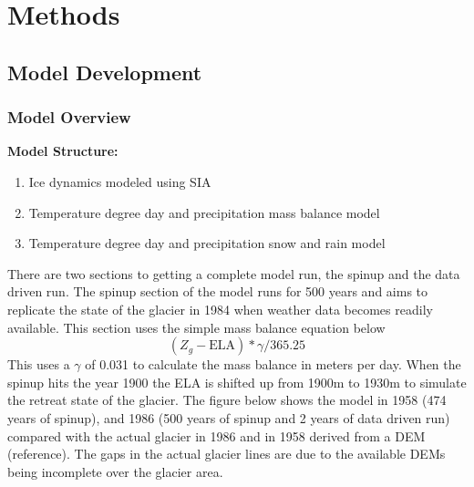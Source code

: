 \documentclass{article}
\begin{document}
\section{Methods}

\subsection{Model Development}
\subsubsection{Model Overview}

\textbf{Model Structure:}
\begin{enumerate}[leftmargin=2cm]
    \item Ice dynamics modeled using SIA
    \item Temperature degree day and precipitation mass balance model
    \item Temperature degree day and precipitation snow and rain model
\end{enumerate}

There are two sections to getting a complete model run, the spinup and the data driven run. The spinup section of the model runs for 500 years and aims to replicate the 
state of the glacier in 1984 when weather data becomes readily available. This section uses the simple mass balance equation below
\begin{equation}(Z_g-\text{ELA})*\gamma /365.25\end{equation}
This uses a $\gamma$ of 0.031 to calculate the mass balance in meters per day. When the spinup hits the year 1900 the ELA is shifted up from 1900m to 1930m to simulate the 
retreat state of the glacier. The figure below shows the model in 1958 (474 years of spinup), and 1986 (500 years of spinup and 2 years of data driven run) compared with the actual 
glacier in 1986 and in 1958 derived from a DEM (reference). The gaps in the actual glacier lines are due to the available DEMs being incomplete over the glacier area.
\end{document}
